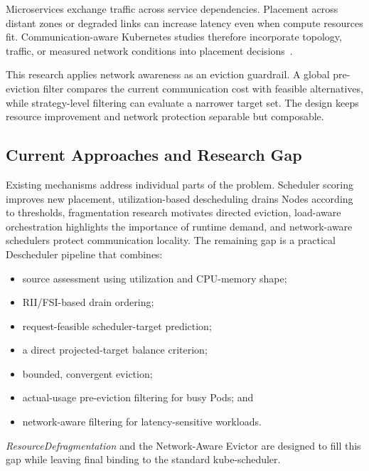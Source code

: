 Microservices exchange traffic across service dependencies. Placement across distant zones or degraded links can increase latency even when compute resources fit. Communication-aware Kubernetes studies therefore incorporate topology, traffic, or measured network conditions into placement decisions~\cite{marchese2022network,marchese_tomarchio_2022,chen2024trade,pusztai_pogonip_2021}.

This research applies network awareness as an eviction guardrail. A global pre-eviction filter compares the current communication cost with feasible alternatives, while strategy-level filtering can evaluate a narrower target set. The design keeps resource improvement and network protection separable but composable.

\subsection{Current Approaches and Research Gap}
\label{sec:researchGap}

Existing mechanisms address individual parts of the problem. Scheduler scoring improves new placement, utilization-based descheduling drains Nodes according to thresholds, fragmentation research motivates directed eviction, load-aware orchestration highlights the importance of runtime demand, and network-aware schedulers protect communication locality. The remaining gap is a practical Descheduler pipeline that combines:

\begin{itemize}
    \item source assessment using utilization and CPU-memory shape;
    \item RII/FSI-based drain ordering;
    \item request-feasible scheduler-target prediction;
    \item a direct projected-target balance criterion;
    \item bounded, convergent eviction;
    \item actual-usage pre-eviction filtering for busy Pods; and
    \item network-aware filtering for latency-sensitive workloads.
\end{itemize}

\textit{ResourceDefragmentation} and the Network-Aware Evictor are designed to fill this gap while leaving final binding to the standard kube-scheduler.
